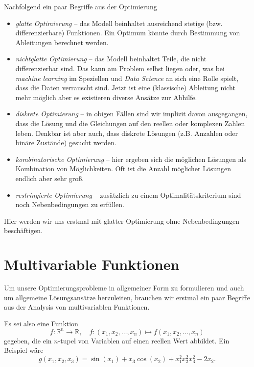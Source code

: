 \documentclass[]{book}
\providecommand{\tightlist}{%
  \setlength{\itemsep}{0pt}\setlength{\parskip}{0pt}}
\theoremstyle{definition}
\theoremstyle{definition}
\theoremstyle{definition}
\theoremstyle{definition}
\theoremstyle{remark}
\begin{document}
Nachfolgend ein paar Begriffe aus der Optimierung

\begin{itemize}
\tightlist
\item
  \emph{glatte Optimierung} -- das Modell beinhaltet ausreichend stetige (bzw. differenzierbare) Funktionen. Ein Optimum könnte durch Bestimmung von Ableitungen berechnet werden.
\item
  \emph{nichtglatte Optimierung} -- das Modell beinhaltet Teile, die nicht differenzierbar sind. Das kann am Problem selbst liegen oder, was bei \emph{machine learning} im Speziellen und \emph{Data Science} an sich eine Rolle spielt, dass die Daten verrauscht sind. Jetzt ist eine (klassische) Ableitung nicht mehr möglich aber es existieren diverse Ansätze zur Abhilfe.
\item
  \emph{diskrete Optimierung} -- in obigen Fällen sind wir implizit davon ausgegangen, dass die Lösung und die Gleichungen auf den reellen oder komplexen Zahlen leben. Denkbar ist aber auch, dass diskrete Lösungen (z.B. Anzahlen oder binäre Zustände) gesucht werden.
\item
  \emph{kombinatorische Optimierung} -- hier ergeben sich die möglichen Lösungen als Kombination von Möglichkeiten. Oft ist die Anzahl möglicher Lösungen endlich aber sehr groß.
\item
  \emph{restringierte Optimierung} -- zusätzlich zu einem Optimalitätskriterium sind noch Nebenbedingungen zu erfüllen.
\end{itemize}

Hier werden wir uns erstmal mit glatter Optimierung ohne Nebenbedingungen beschäftigen.

\hypertarget{multivariable-funktionen}{%
\section{Multivariable Funktionen}\label{multivariable-funktionen}}

Um unsere Optimierungsprobleme in allgemeiner Form zu formulieren und auch um allgemeine Lösungsansätze herzuleiten, brauchen wir erstmal ein paar Begriffe aus der Analysis von multivariablen Funktionen.

Es sei also eine Funktion
\begin{equation*}
f\colon \mathbb R^{n}\to \mathbb R^{}, \quad f \colon (x_1,x_2, \dots, x_n) \mapsto f(x_1, x_2, \dotsc, x_n)
\end{equation*}
gegeben, die ein \(n\)-tupel von Variablen auf einen reellen Wert abbildet. Ein Beispiel wäre
\begin{equation*}
g(x_1, x_2, x_3) = \sin(x_1) + x_3\cos(x_2) + x_1^2 x_2^2 x_3^2 - 2x_2.
\end{equation*}
\end{document}
